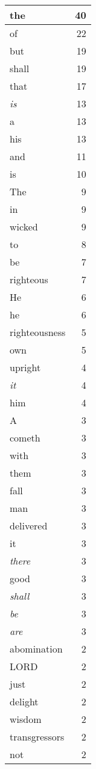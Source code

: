 \begin{center}
\begin{longtable}{l|r}
the & 40\\ \hline 
of & 22\\ \hline 
but & 19\\ \hline 
shall & 19\\ \hline 
that & 17\\ \hline 
\emph{is} & 13\\ \hline 
a & 13\\ \hline 
his & 13\\ \hline 
and & 11\\ \hline 
is & 10\\ \hline 
The & 9\\ \hline 
in & 9\\ \hline 
wicked & 9\\ \hline 
to & 8\\ \hline 
be & 7\\ \hline 
righteous & 7\\ \hline 
He & 6\\ \hline 
he & 6\\ \hline 
righteousness & 5\\ \hline 
own & 5\\ \hline 
upright & 4\\ \hline 
\emph{it} & 4\\ \hline 
him & 4\\ \hline 
A & 3\\ \hline 
cometh & 3\\ \hline 
with & 3\\ \hline 
them & 3\\ \hline 
fall & 3\\ \hline 
man & 3\\ \hline 
delivered & 3\\ \hline 
it & 3\\ \hline 
\emph{there} & 3\\ \hline 
good & 3\\ \hline 
\emph{shall} & 3\\ \hline 
\emph{be} & 3\\ \hline 
\emph{are} & 3\\ \hline 
abomination & 2\\ \hline 
LORD & 2\\ \hline 
just & 2\\ \hline 
delight & 2\\ \hline 
wisdom & 2\\ \hline 
transgressors & 2\\ \hline 
not & 2\\ \hline 

\end{longtable}
\end{center}
